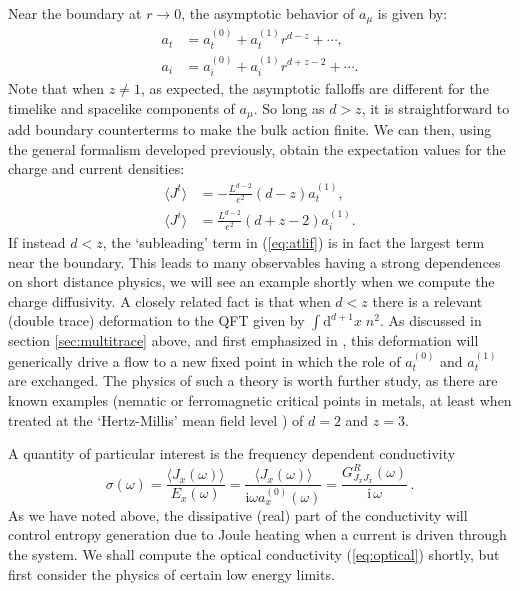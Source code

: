\documentclass[10pt, oneside]{book}
\def\be{\begin{equation}}
\def\ee{\end{equation}}
\begin{document}
\begin{doublespace}
Near the boundary at $r\rightarrow 0$, the asymptotic behavior of $a_\mu$ is given by: \begin{subequations}\label{eq:34nearb}\begin{align}
a_t &= a_t^{(0)} + a_t^{(1)} r^{d-z} + \cdots, \label{eq:atlif} \\
a_i &= a_i^{(0)} + a_i^{(1)} r^{d+z-2} + \cdots.\label{eq:ailif}
\end{align}\end{subequations}
Note that when $z\ne 1$, as expected, the asymptotic falloffs are different for the timelike and spacelike components of $a_\mu$.   So long as $d>z$, it is straightforward to add boundary counterterms to make the bulk action finite. We can then, using the general formalism developed previously, obtain the expectation values for the charge and current densities:
 \begin{subequations}\begin{align}
\langle J^t \rangle &= -\frac{L^{d-2}}{e^2} (d-z)a_t^{(1)},  \label{eq:jt1} \\
\langle J^i \rangle &= \frac{L^{d-2}}{e^2} (d+z-2)a_i^{(1)}.  \label{eq:jx1}
\end{align}\end{subequations}
If instead $d<z$, the `subleading' term in (\ref{eq:atlif}) is in fact the largest term near the boundary. This leads to many observables having a strong dependences on short distance physics, we will see an example shortly when we compute the charge diffusivity. A closely related fact is that when $d<z$ there is a relevant (double trace) deformation to the QFT given by $\int \mathrm{d}^{d+1}x \; n^2$. As discussed in section \ref{sec:multitrace} above, and first emphasized in \cite{Hartnoll:2009ns}, this deformation will generically drive a flow to a new fixed point in which the role of $a_t^{(0)}$ and $a_t^{(1)}$ are exchanged. The physics of such a theory is worth further study, as there are known examples (nematic or ferromagnetic critical points in metals, at least when treated at the `Hertz-Millis' mean field level \cite{PhysRevB.14.1165,metlitski1}) of $d=2$ and $z=3$.


A quantity of particular interest is the  frequency dependent conductivity
\be\label{eq:optical}
\sigma(\omega)  = \frac{\langle J_x(\omega)\rangle}{E_x(\omega)} = \frac{\langle J_x(\omega)\rangle }{\mathrm{i}\omega a^{(0)}_x(\omega)} = \frac{G^R_{J_xJ_x}(\omega)}{\mathrm{i} \, \omega} \,.
\ee
As we have noted above, the dissipative (real) part of the conductivity will control entropy generation due to Joule heating when a current is driven through the system. We shall compute the optical conductivity (\ref{eq:optical}) shortly, but first consider the physics of certain low energy limits.


\end{doublespace}
\end{document}
